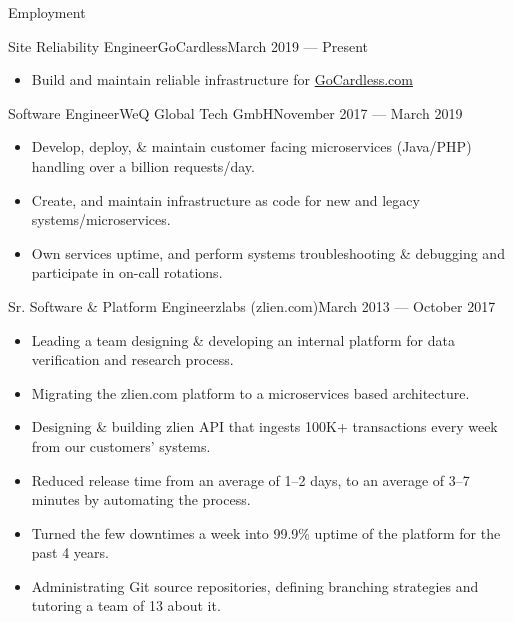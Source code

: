 \documentclass[]{mosabcv}
\begin{document}
\makeheader{}

\begin{cvsection}{Employment}
  \begin{cvsubsection}{Site Reliability Engineer}{GoCardless}{March 2019 ---
    Present}
    \begin{itemize}
      \item Build and maintain reliable infrastructure for
        \href{https://www.gocardless.com}{GoCardless.com}
    \end{itemize}
  \end{cvsubsection}

  \begin{cvsubsection}{Software Engineer}{WeQ Global Tech GmbH}{November 2017 ---
    March 2019}    \begin{itemize}
      \item Develop, deploy, \& maintain customer facing microservices
        (Java/PHP) handling over a billion requests/day.
      \item Create, and maintain infrastructure as code for new and legacy
        systems/microservices.
      \item Own services uptime, and perform systems troubleshooting \&
        debugging and participate in on-call rotations.
    \end{itemize}
  \end{cvsubsection}

  \begin{cvsubsection}{Sr. Software \& Platform Engineer}{zlabs
    (zlien.com)}{March 2013 --- October 2017}
    \begin{itemize}
      \item Leading a team designing \& developing an internal platform for data
        verification and research process.
      \item Migrating the zlien.com platform to a microservices based
        architecture.
      \item Designing \& building zlien API that ingests 100K+ transactions
        every week from our customers' systems.
      \item Reduced release time from an average of 1--2 days, to an average of
        3--7 minutes by automating the process.
      \item Turned the few downtimes a week into 99.9\% uptime of the platform
        for the past 4 years.
      \item Administrating Git source repositories, defining branching
        strategies and tutoring a team of 13 about it.
    \end{itemize}
  \end{cvsubsection}


\end{cvsection}
\end{document}
